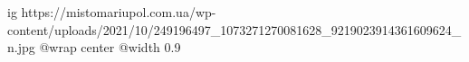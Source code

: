  
 
 
 
 

\ifcmt
  ig https://mistomariupol.com.ua/wp-content/uploads/2021/10/249196497_1073271270081628_9219023914361609624_n.jpg
  @wrap center
  @width 0.9
\fi
